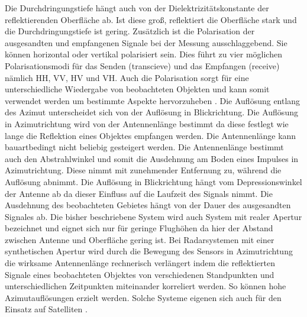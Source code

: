 Die Durchdringungstiefe hängt auch von der Dielektrizitätskonstante der reflektierenden Oberfläche ab. Ist diese groß, reflektiert die Oberfläche stark und die 
Durchdringungstiefe ist gering. Zusätzlich ist die Polarisation der ausgesandten und empfangenen Signale bei der Messung ausschlaggebend. Sie können horizontal oder 
vertikal polarisiert sein. Dies führt zu vier möglichen Polarisationsmodi für das Senden (transcieve) und das Empfangen (receive) nämlich HH, VV, HV und VH. Auch die 
Polarisation sorgt für eine unterschiedliche Wiedergabe von beobachteten Objekten und kann somit verwendet werden um bestimmte Aspekte hervorzuheben \cite{einfuehrung_in_fernerkundung}. 
Die Auflösung entlang des Azimut unterscheidet sich von der Auflösung in Blickrichtung. Die Auflösung in Azimutrichtung wird von der Antennenlänge 
bestimmt da diese festlegt wie lange die Reflektion eines Objektes empfangen werden. Die Antennenlänge kann bauartbedingt nicht beliebig gesteigert werden.
Die Antennenlänge bestimmt auch den Abstrahlwinkel und somit die Ausdehnung am Boden eines Impulses in Azimutrichtung. Diese nimmt mit zunehmender Entfernung
zu, während die Auflösung abnimmt.
Die Auflösung in Blickrichtung hängt vom Depressionswinkel der Antenne ab da dieser Einfluss auf die Laufzeit des Signals nimmt. Die Ausdehnung des beobachteten Gebietes hängt von der Dauer des ausgesandten Signales ab. Die bisher beschriebene System wird auch System mit realer Apertur bezeichnet und eignet sich nur für geringe
Flughöhen da hier der Abstand zwischen Antenne und Oberfläche gering ist. 
Bei Radarsystemen mit einer synthetischen Apertur wird durch die Bewegung des Sensors in Azimutrichtung die wirksame Antennenlänge rechnerisch verlängert indem 
die reflektierten Signale eines beobachteten Objektes von verschiedenen Standpunkten und unterschiedlichen Zeitpunkten miteinander korreliert werden. So können 
hohe Azimutauflösungen erzielt werden. Solche Systeme eigenen sich auch für den Einsatz auf Satelliten \cite{einfuehrung_in_fernerkundung}.

